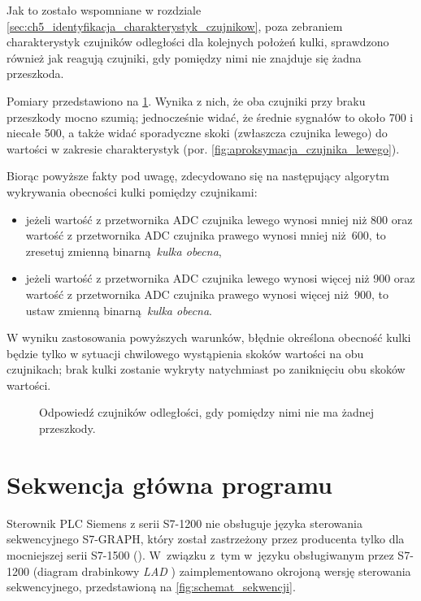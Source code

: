 Jak to zostało wspomniane w rozdziale \ref{sec:ch5_identyfikacja_charakterystyk_czujnikow}, poza zebraniem charakterystyk czujników odległości dla kolejnych położeń kulki, sprawdzono również jak reagują czujniki, gdy pomiędzy nimi nie znajduje się żadna przeszkoda.

Pomiary przedstawiono na \cref{fig:czujniki_charakterystyka_bez_przeszkody}. Wynika z nich, że oba czujniki przy braku przeszkody mocno szumią; jednocześnie widać, że średnie sygnałów to około \num{700} i niecałe \num{500}, a także widać sporadyczne skoki (zwłaszcza czujnika lewego) do wartości w zakresie charakterystyk (por. \cref{fig:aproksymacja_czujnika_lewego}).

Biorąc powyższe fakty pod uwagę, zdecydowano się na następujący algorytm wykrywania obecności kulki pomiędzy czujnikami:
\begin{itemize}
    \item jeżeli wartość z przetwornika ADC czujnika lewego wynosi mniej niż \num{800} oraz wartość z przetwornika ADC czujnika prawego wynosi mniej niż \num{600}, to zresetuj zmienną binarną \textit{kulka obecna},
    \item jeżeli wartość z przetwornika ADC czujnika lewego wynosi więcej niż \num{900} oraz wartość z przetwornika ADC czujnika prawego wynosi więcej niż \num{900}, to ustaw zmienną binarną \textit{kulka obecna}.
\end{itemize}

W wyniku zastosowania powyższych warunków, błędnie określona obecność kulki będzie tylko w sytuacji chwilowego wystąpienia skoków wartości na obu czujnikach; brak kulki zostanie wykryty natychmiast po zaniknięciu obu skoków wartości.

\begin{figure}[ht]
    \centering
        
    \caption{Odpowiedź czujników odległości, gdy pomiędzy nimi nie ma żadnej przeszkody.}
    \label{fig:czujniki_charakterystyka_bez_przeszkody}
\end{figure}

\section{Sekwencja główna programu}
\label{sec:sekwencja_glowna}

Sterownik PLC Siemens z serii S7-1200 nie obsługuje języka sterowania sekwencyjnego \textsc{S7-GRAPH}, który został zastrzeżony przez producenta tylko dla mocniejszej serii S7-1500 (\cite{SCL_S71200_S71500}). W~związku z~tym w~języku obsługiwanym przez S7-1200 (diagram drabinkowy \textit{LAD} \cite{PROGRAMOWANIE_PLC}) zaimplementowano okrojoną wersję sterowania sekwencyjnego, przedstawioną na \cref{fig:schemat_sekwencji}.


